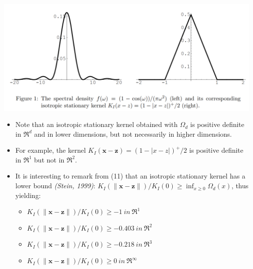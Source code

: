 \documentclass[
  ignorenonframetext,
]{beamer}
\providecommand{\tightlist}{%
  \setlength{\itemsep}{0pt}\setlength{\parskip}{0pt}}
\begin{document}
\begin{frame}{}
\protect\hypertarget{section-1}{}
\begin{center}\includegraphics[width=0.8\linewidth]{figure/marc_f1} \end{center}
\end{frame}

\begin{frame}{}
\protect\hypertarget{section-2}{}
\begin{itemize}
\item
  Note that an isotropic stationary kernel obtained with \(\Omega_d\) is
  positive definite in \(\mathfrak R^d\) and in lower dimensions, but
  not necessarily in higher dimensions.
\item
  For example, the kernel \(K_I(\pmb x - \pmb z) = (1 - |x - z|)^+/2\)
  is positive definite in \(\mathfrak R^1\) but not in
  \(\mathfrak R^2\).
\item
  It is interesting to remark from (11) that an isotropic stationary
  kernel has a lower bound \emph{(Stein, 1999)}:
  \(K_I(\|\pmb x - \pmb z\|)/K_I(0) \geq \inf_{x \geq 0} \Omega_d(x)\),
  thus yielding:

  \begin{itemize}
  \tightlist
  \item
    \(K_I(\|\pmb x - \pmb z\|)/K_I(0) \geq -1\ in\ \mathfrak R^1\)\\
  \item
    \(K_I(\|\pmb x - \pmb z\|)/K_I(0) \geq -0.403\ in\ \mathfrak R^2\)\\
  \item
    \(K_I(\|\pmb x - \pmb z\|)/K_I(0) \geq -0.218\ in\ \mathfrak R^3\)\\
  \item
    \(K_I(\|\pmb x - \pmb z\|)/K_I(0) \geq 0\ in\ \mathfrak R^\infty\)
  \end{itemize}
\end{itemize}
\end{frame}
\end{document}
